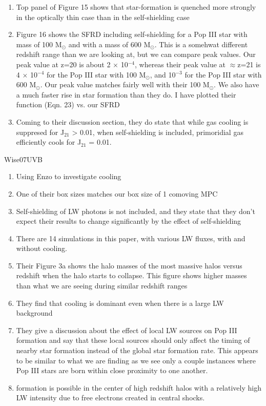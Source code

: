 \documentclass[a4paper,fleqn,usenatbib]{mnras}
\begin{document}
\begin{enumerate}
	\item Top panel of Figure 15 shows that star-formation is quenched more strongly in the optically thin case than in the self-shielding case
	\item Figure 16 shows the SFRD including self-shielding for a Pop III star with mass of 100 M$_{\odot}$ and with a mass of 600 M$_{\odot}$. This is a somehwat different redshift range than we are looking at, but we can compare peak values. Our peak value at z=20 is about 2 $\times$ 10$^{-4}$, whereas their peak value at $\approx$z=21 is 4 $\times$ 10$^{-4}$ for the Pop III star with 100 M$_{\odot}$, and 10$^{-3}$ for the Pop III star with 600 M$_{\odot}$. Our peak value matches fairly well with their 100 M$_{\odot}$. We also have a much faster rise in star formation than they do. I have plotted their function (Eqn. 23) vs. our SFRD
	\item Coming to their discussion section, they do state that while gas cooling is suppresed for J$_{21}$ > 0.01, when self-shielding is included, primoridial gas efficiently cools for J$_{21}$ = 0.01.
\end{enumerate}

\li Wise07UVB
\begin{enumerate}
	\item Using Enzo to investigate \hh{} cooling
	\item One of their box sizes matches our box size of 1 comoving MPC
	\item Self-shielding of LW photons is not included, and they state that they don't expect their results to change significantly by the effect of self-shielding
	\item There are 14 simulations in this paper, with various LW fluxes, with and without \hh{} cooling. 
	\item Their Figure 3a shows the halo masses of the most massive halos versus redshift when the halo starts to collapse. This figure shows higher masses than what we are seeing during similar redshift ranges
	\item They find that \hh{} cooling is dominant even when there is a large LW background
	\item They give a discussion about the effect of local LW sources on Pop III formation and say that these local sources should only affect the timing of nearby star formation instead of the global star formation rate. This appears to be similar to what we are finding as we see only a couple instances where Pop III stars are born within close proximity to one another. 
	\item \hh{} formation is possible in the center of high redshift halos with a relatively high LW intensity due to free electrons created in central shocks.
\end{enumerate}
\end{document}
